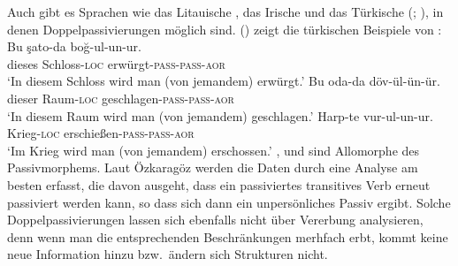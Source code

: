Auch gibt es Sprachen wie das Litauische \citep[Abschnitt~5]{Timberlake82a}, das
Irische \citep{Noonan94a} und das Türkische (\citealp{Ozkaragoez86a};
\citealp[Abschnitt~2.3.3]{Knecht85a-u}), in denen Doppelpassivierungen möglich sind. () zeigt
die türkischen Beispiele von \citet[]{Ozkaragoez86a}:
\eal
\ex\label{ex-double-passivization-strangle}
\gll Bu şato-da boğ-ul-un-ur.\\
     dieses Schloss-\textsc{loc} erwürgt-\textsc{pass}-\textsc{pass}-\textsc{aor}\\
\glt `In diesem Schloss wird man (von jemandem) erwürgt.'
\ex\label{ex-double-passivization-hit}
\gll Bu oda-da döv-ül-ün-ür.\\
     dieser Raum-\textsc{loc} geschlagen-\textsc{pass}-\textsc{pass}-\textsc{aor}\\
\glt `In diesem Raum wird man (von jemandem) geschlagen.'
\ex
\gll Harp-te vur-ul-un-ur.\\
     Krieg-\textsc{loc} erschießen-\textsc{pass}-\textsc{pass}-\textsc{aor}\\
\glt `Im Krieg wird man (von jemandem) erschossen.'
\zl
{},  und  sind Allomorphe des Passivmorphems. Laut Özkaragöz werden
die Daten durch eine Analyse am besten erfasst, die davon ausgeht, dass ein passiviertes transitives
Verb erneut passiviert werden kann, so dass sich dann ein unpersönliches Passiv ergibt. Solche
Doppelpassivierungen lassen sich ebenfalls nicht über Vererbung analysieren, denn wenn man die
entsprechenden Beschränkungen merhfach erbt, kommt keine neue Information hinzu bzw.\ ändern sich
Strukturen nicht.

